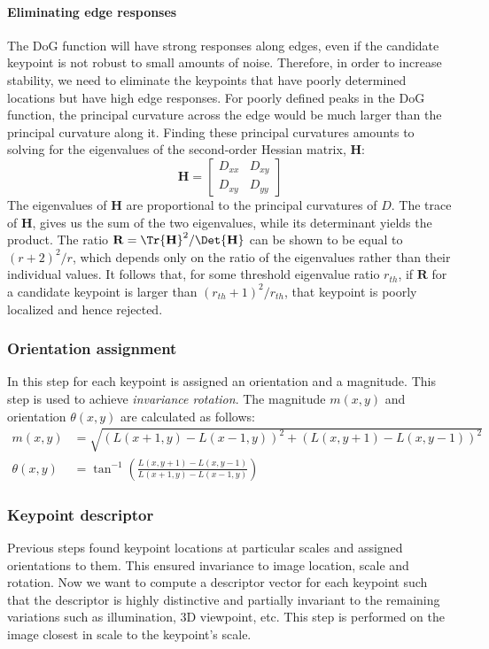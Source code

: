 \paragraph{Eliminating edge responses}
The \ac{DoG} function will have strong responses along edges, even if the
candidate keypoint is not robust to small amounts of noise. Therefore, in order
to increase stability, we need to eliminate the keypoints that have poorly
determined locations but have high edge responses.
For poorly defined peaks in the \ac{DoG} function, the principal curvature across
the edge would be much larger than the principal curvature along it.
Finding these principal curvatures amounts to solving for the eigenvalues of the
second-order Hessian matrix, $\mathbf{H}$:
\[
    \mathbf{H}=\begin{bmatrix} D_{xx} & D_{xy} \\ D_{xy} & D_{yy} \end{bmatrix}
\]
The eigenvalues of $\mathbf{H}$ are proportional to the principal curvatures of
$D$. The trace of $\mathbf{H}$, gives us the sum of the two eigenvalues, while
its determinant yields the product. The ratio
$\mathbf{R}=\Tr{\mathbf{H}}^2/\Det{\mathbf{H}}$ can be shown to be equal to
$(r+2)^2/r$, which depends only on the ratio of the eigenvalues rather than their
individual values. It follows that, for some threshold eigenvalue ratio $r_{th}$,
if $\mathbf{R}$ for a candidate keypoint is larger than $(r_{th}+1)^2/r_{th}$,
that keypoint is poorly localized and hence rejected. 

\subsubsection{Orientation assignment}
In this step for each keypoint is assigned an orientation and a magnitude. This
step is used to achieve \emph{invariance rotation}. The magnitude $m(x,y)$ and
orientation $\theta(x,y)$ are calculated as follows:
\begin{equation*}
\begin{split}
    m(x,y)&=\sqrt{\left(L(x+1,y)-L(x-1,y)\right)^2+\left(L(x,y+1)-L(x,y-1)\right)^2}\\
    \theta(x,y)&=\tan^{-1}{\left(\frac{L(x,y+1)-L(x,y-1)}{L(x+1,y)-L(x-1,y)}\right)}
\end{split}
\end{equation*}


\subsubsection{Keypoint descriptor}
Previous steps found keypoint locations at particular scales and assigned
orientations to them. This ensured invariance to image location, scale and
rotation. Now we want to compute a descriptor vector for each keypoint such that
the descriptor is highly distinctive and partially invariant to the remaining
variations such as illumination, 3D viewpoint, etc. This step is performed on the
image closest in scale to the keypoint's scale.

